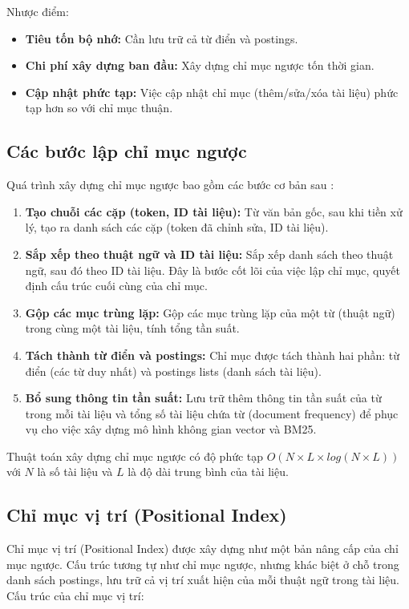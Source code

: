 \documentclass[../BTL.tex]{subfiles}
\begin{document}
Nhược điểm:
\begin{itemize}
    \item \textbf{Tiêu tốn bộ nhớ:} Cần lưu trữ cả từ điển và postings.
    
    \item \textbf{Chi phí xây dựng ban đầu:} Xây dựng chỉ mục ngược tốn thời gian.
    
    \item \textbf{Cập nhật phức tạp:} Việc cập nhật chỉ mục (thêm/sửa/xóa tài liệu) phức tạp hơn so với chỉ mục thuận.
\end{itemize}

\subsection{Các bước lập chỉ mục ngược}
Quá trình xây dựng chỉ mục ngược bao gồm các bước cơ bản sau \cite{manning2008introduction}:

\begin{enumerate}
    \item \textbf{Tạo chuỗi các cặp (token, ID tài liệu):} Từ văn bản gốc, sau khi tiền xử lý, tạo ra danh sách các cặp (token đã chỉnh sửa, ID tài liệu).
    
    \item \textbf{Sắp xếp theo thuật ngữ và ID tài liệu:} Sắp xếp danh sách theo thuật ngữ, sau đó theo ID tài liệu. Đây là bước cốt lõi của việc lập chỉ mục, quyết định cấu trúc cuối cùng của chỉ mục.
    
    \item \textbf{Gộp các mục trùng lặp:} Gộp các mục trùng lặp của một từ (thuật ngữ) trong cùng một tài liệu, tính tổng tần suất.
    
    \item \textbf{Tách thành từ điển và postings:} Chỉ mục được tách thành hai phần: từ điển (các từ duy nhất) và postings lists (danh sách tài liệu).
    
    \item \textbf{Bổ sung thông tin tần suất:} Lưu trữ thêm thông tin tần suất của từ trong mỗi tài liệu và tổng số tài liệu chứa từ (document frequency) để phục vụ cho việc xây dựng mô hình không gian vector và BM25.
\end{enumerate}

Thuật toán xây dựng chỉ mục ngược có độ phức tạp $O(N \times L \times log(N \times L))$ với $N$ là số tài liệu và $L$ là độ dài trung bình của tài liệu.

\subsection{Chỉ mục vị trí (Positional Index)}
Chỉ mục vị trí (Positional Index) được xây dựng như một bản nâng cấp của chỉ mục ngược. Cấu trúc tương tự như chỉ mục ngược, nhưng khác biệt ở chỗ trong danh sách postings, lưu trữ cả vị trí xuất hiện của mỗi thuật ngữ trong tài liệu. Cấu trúc của chỉ mục vị trí:
\end{document}
